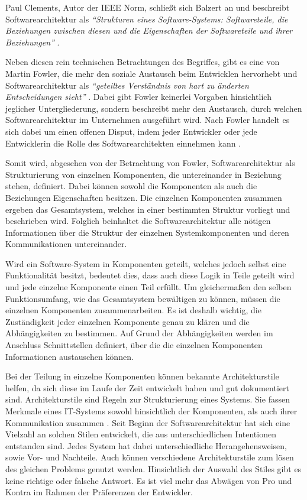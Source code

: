 Paul Clements, Autor der IEEE Norm, schließt sich Balzert an und beschreibt Softwarearchitektur als \textit{\enquote{Strukturen eines Software-Systems: Softwareteile, die Beziehungen zwischen diesen und die Eigenschaften der Softwareteile und ihrer Beziehungen}} \parencite[][S. 23]{clements_documenting_2010}.

Neben diesen rein technischen Betrachtungen des Begriffes, gibt es eine von Martin Fowler, die mehr den soziale Austausch beim Entwicklen hervorhebt und Softwarearchitektur als  \textit{\enquote{geteiltes Verständnis von hart zu änderten Entscheidungen sieht}} \parencite[][S. 3]{fowler_who_2003}. Dabei gibt Fowler keinerlei Vorgaben hinsichtlich jeglicher Untergliederung, sondern beschreibt mehr den Austausch, durch welchen Softwarearchitektur im Unternehmen ausgeführt wird. Nach Fowler handelt es sich dabei um einen offenen Disput, indem jeder Entwickler oder jede Entwicklerin die Rolle des Softwarearchitekten einnehmen kann \parencite[][S. 3 f.]{fowler_who_2003}.

Somit wird, abgesehen von der Betrachtung von Fowler, Softwarearchitektur als Strukturierung von einzelnen Komponenten, die untereinander in Beziehung stehen, definiert. Dabei können sowohl die Komponenten als auch die Beziehungen Eigenschaften besitzen. Die einzelnen Komponenten zusammen ergeben das Gesamtsystem, welches in einer bestimmten Struktur vorliegt und beschrieben wird. Folglich beinhaltet die Softwarearchitektur alle nötigen Informationen über die Struktur der einzelnen Systemkomponenten und deren Kommunikationen untereinander.

Wird ein Software-System in Komponenten geteilt, welches jedoch selbst eine Funktionalität besitzt, bedeutet dies, dass auch diese Logik in Teile geteilt wird und jede einzelne Komponente einen Teil erfüllt. Um gleichermaßen den selben Funktionsumfang, wie das Gesamtsystem bewältigen zu können, müssen die einzelnen Komponenten zusammenarbeiten. Es ist deshalb wichtig, die Zuständigkeit jeder einzelnen Komponente genau zu klären und die Abhängigkeiten zu bestimmen. Auf Grund der Abhängigkeiten werden im Anschluss Schnittstellen definiert, über die die einzelnen Komponenten Informationen austauschen können.

Bei der Teilung in einzelne Komponenten können bekannte Architekturstile helfen, da sich diese im Laufe der Zeit entwickelt haben und gut dokumentiert sind. Architekturstile sind Regeln zur Strukturierung eines Systems. Sie fassen Merkmale eines IT-Systems sowohl hinsichtlich der Komponenten, als auch ihrer Kommunikation zusammen \parencite[vgl.][S. 102]{starke_effektive_2015}. Seit Beginn der Softwarearchitektur hat sich eine Vielzahl an solchen Stilen entwickelt, die aus unterschiedlichen Intentionen entstanden sind. Jedes System hat dabei unterschiedliche Herangehensweisen, sowie Vor- und Nachteile. 
Auch können verschiedene Architekturstile zum lösen des gleichen Problems genutzt werden. Hinsichtlich der Auswahl des Stiles gibt es keine richtige oder falsche Antwort. Es ist viel mehr das Abwägen von Pro und Kontra im Rahmen der Präferenzen der Entwickler.

